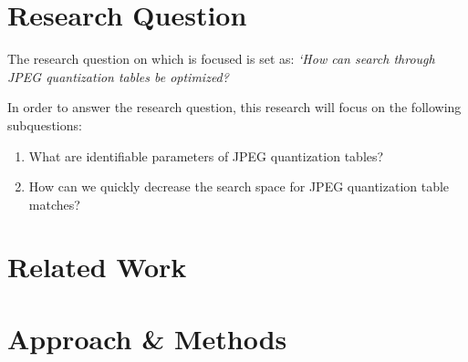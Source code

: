 \documentclass[a4paper,8pt]{article}
\begin{document}





\section*{Research Question}

The research question on which is focused is set as: \textit{`How can search through JPEG quantization tables be optimized?}

In order to answer the research question, this research will focus on the following subquestions:
\begin{enumerate}
\item What are identifiable parameters of JPEG quantization tables?
\item How can we quickly decrease the search space for JPEG quantization table matches?
\end{enumerate}

\section*{Related Work}

\section*{Approach \& Methods}
\end{document}
